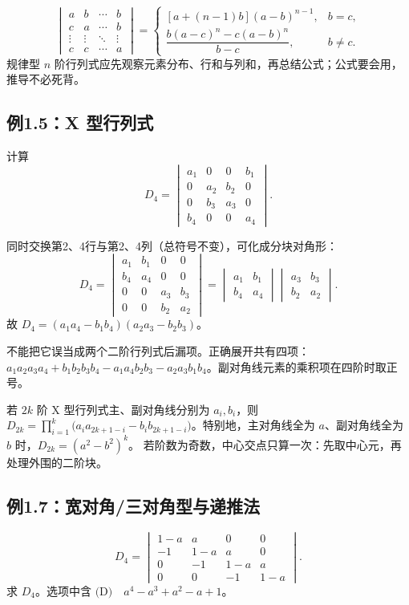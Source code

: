 \documentclass[UTF8,zihao=5,fontset=mac]{ctexart}
\newcommand{\dmat}[1]{\begin{vmatrix}#1\end{vmatrix}}
\begin{document}
\begin{summarybox}[更一般的“上 $b$、下 $c$”型]
\[
\dmat{a&b&\cdots&b\\c&a&\cdots&b\\\vdots&\vdots&\ddots&\vdots\\c&c&\cdots&a}
=
\begin{cases}
[a+(n-1)b](a-b)^{n-1},&b=c,\\[1mm]
\dfrac{b(a-c)^n-c(a-b)^n}{b-c},&b\ne c.
\end{cases}
\]
规律型 $n$ 阶行列式应先观察元素分布、行和与列和，再总结公式；公式要会用，推导不必死背。
\end{summarybox}

\subsection{例1.5：X 型行列式}
\begin{problembox}[题目]
计算
\[
D_4=\dmat{a_1&0&0&b_1\\0&a_2&b_2&0\\0&b_3&a_3&0\\b_4&0&0&a_4}.
\]
\end{problembox}

同时交换第2、4行与第2、4列（总符号不变），可化成分块对角形：
\[
D_4=
\dmat{a_1&b_1&0&0\\b_4&a_4&0&0\\0&0&a_3&b_3\\0&0&b_2&a_2}
=\dmat{a_1&b_1\\b_4&a_4}\dmat{a_3&b_3\\b_2&a_2}.
\]
故 $\boxed{D_4=(a_1a_4-b_1b_4)(a_2a_3-b_2b_3)}$。

\begin{warningbox}
不能把它误当成两个二阶行列式后漏项。正确展开共有四项：$a_1a_2a_3a_4+b_1b_2b_3b_4-a_1a_4b_2b_3-a_2a_3b_1b_4$。副对角线元素的乘积项在四阶时取正号。
\end{warningbox}

\begin{summarybox}[X 型总公式]
若 $2k$ 阶 X 型行列式主、副对角线分别为 $a_i,b_i$，则 $D_{2k}=\prod_{i=1}^{k}\bigl(a_i a_{2k+1-i}-b_i b_{2k+1-i}\bigr)$。特别地，主对角线全为 $a$、副对角线全为 $b$ 时，$D_{2k}=(a^2-b^2)^k$。
若阶数为奇数，中心交点只算一次：先取中心元，再处理外围的二阶块。
\end{summarybox}

\subsection{例1.7：宽对角/三对角型与递推法}
\begin{problembox}[题目]
\[
D_4=\dmat{1-a&a&0&0\\-1&1-a&a&0\\0&-1&1-a&a\\0&0&-1&1-a}.
\]
求 $D_4$。选项中含 $\text{(D)}\quad a^4-a^3+a^2-a+1$。
\end{problembox}
\end{document}
